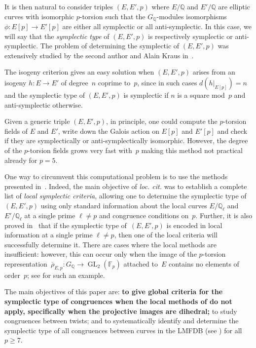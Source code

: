 \documentclass[12pt, reqno]{amsart}
\newcommand{\F}{\mathbb{F}}
\newcommand{\Q}{\mathbb{Q}}
\newcommand{\rhobar}{{\overline{\rho}}}
\newcommand{\GL}{\operatorname{GL}}
\numberwithin{equation}{section}
\theoremstyle{definition}
\theoremstyle{remark}
\begin{document}
It is then natural to consider triples $(E,E',p)$ where $E/\Q$ and $E'/\Q$ are elliptic
curves with isomorphic $p$-torsion such that the $G_\Q$-modules
isomorphisms $\phi : E[p] \rightarrow E'[p]$ are either all symplectic
or all anti-symplectic.  In this case, we will say that the {\em
  symplectic type} of $(E,E',p)$ is respectively symplectic or
anti-symplectic.  The problem of determining the symplectic of
$(E,E',p)$ was extensively studied by the second author and Alain
Kraus in~\cite{FKSym}.

The isogeny criterion gives an easy solution when $(E,E',p)$
arises from an isogeny $h \colon E \to E'$ of degree~$n$ coprime
to~$p$, since in such cases $d(h|_{E[p]}) = n$ and the symplectic type
of $(E,E',p)$ is symplectic if $n$ is a square mod~$p$ and
anti-symplectic otherwise.

Given a generic triple $(E, E', p)$, in principle, one
could compute the $p$-torsion fields of $E$ and $E'$,
write down the Galois action on $E[p]$ and $E'[p]$ and check if they
are symplectically or anti-symplectically isomorphic. However, the
degree of the $p$-torsion fields grows very fast with~$p$ making this
method not practical already for $p = 5$.

One way to circumvent this computational problem is to use the methods
presented in~\cite{FKSym}. Indeed, the main objective of {\it loc. cit.} was to establish a complete list of {\em local symplectic criteria},
allowing one to determine the symplectic type of $(E,E',p)$ using only
standard information about the local curves $E/\Q_\ell$ and
$E'/\Q_\ell$ at a single prime $\ell \neq p$ and congruence conditions
on~$p$. Further, it is also proved in~\cite{FKSym}  that if the
symplectic type of~$(E,E',p)$ is encoded in local information at a
single prime $\ell \neq p$, then one of the local criteria will
successfully determine it.  
There are cases where the local methods
are insufficient: however, this can occur only when the image
of the $p$-torsion representation~$\rhobar_{E,p} : G_\Q \to \GL_2(\F_p)$ attached to~$E$ contains no elements of order~$p$;
see \cite[Proposition~16]{FKSym} for such an example.

The main objectives of this paper are: {\bf to give global criteria for the
symplectic type of congruences when the local methods of \cite{FKSym}
do not apply, specifically when the projective images are dihedral;} to
study congruences between twists; and to systematically identify and
determine the symplectic type of all congruences between curves in the
LMFDB (see \cite{lmfdb})
for all~$p\ge7$.
\end{document}
